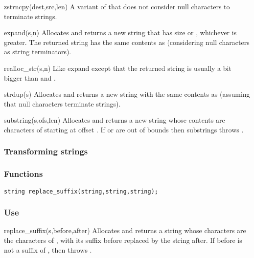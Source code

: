\begin{defun}{zstrncpy}{(dest,src,len)}
A variant of  that does not consider null characters to
terminate strings.
\end{defun}

\begin{defun}{expand}{(s,n)}
Allocates and returns a new string that has size  or
, whichever is greater.  The returned string has
the same contents as  (considering null characters as string
terminators).
\end{defun}

\begin{defun}{realloc_str}{(s,n)}
Like expand except that the returned string is usually a bit bigger than
 and .
\end{defun}

\begin{defun}{strdup}{(s)}
Allocates and returns a new string with the same contents as 
(assuming that null characters terminate strings).
\end{defun}

\begin{defun}{substring}{(s,ofs,len)}
Allocates and returns a new string whose contents are 
characters of  starting at offset .  If  or
 are out of bounds then substrings throws
.
\end{defun}

\subsubsection*{Transforming strings}
\subsubsection*{Functions}
\begin{verbatim}
string replace_suffix(string,string,string);
\end{verbatim}

\subsubsection*{Use}

\begin{defun}{replace_suffix}{(s,before,after)}
Allocates and returns a string whose characters are the characters of
, with its suffix before replaced by the string after.  If before
is not a suffix of , then  throws
.
\end{defun}

